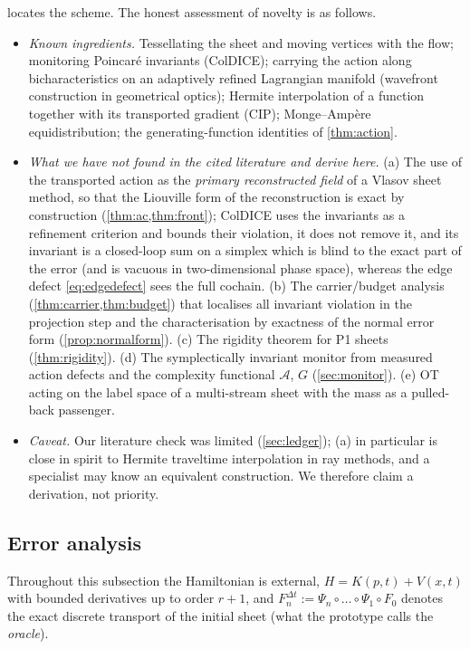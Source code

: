  locates the scheme. The honest assessment of novelty is as follows.
\begin{itemize}[leftmargin=1.6em,itemsep=2pt]
\item \emph{Known ingredients.} Tessellating the sheet and moving vertices with the flow; monitoring Poincar\'e
invariants (ColDICE); carrying the action along bicharacteristics on an adaptively refined Lagrangian manifold
(wavefront construction in geometrical optics); Hermite interpolation of a function together with its transported
gradient (CIP); Monge--Amp\`ere equidistribution; the generating-function identities of \cref{thm:action}.
\item \emph{What we have not found in the cited literature and derive here.} (a) The use of the transported action
as the \emph{primary reconstructed field} of a Vlasov sheet method, so that the Liouville form of the
reconstruction is exact by construction (\cref{thm:ac,thm:front}); ColDICE uses the invariants as a refinement
criterion and bounds their violation, it does not remove it, and its invariant is a closed-loop sum on a simplex
which is blind to the exact part of the error (and is vacuous in two-dimensional phase space), whereas the edge
defect \eqref{eq:edgedefect} sees the full cochain. (b) The carrier/budget analysis (\cref{thm:carrier,thm:budget})
that localises all invariant violation in the projection step and the characterisation by exactness of the normal
error form (\cref{prop:normalform}). (c) The rigidity theorem for P1 sheets (\cref{thm:rigidity}). (d) The
symplectically invariant monitor from measured action defects and the complexity functional $\mathcal A$, $G$
(\cref{sec:monitor}). (e) OT acting on the label space of a multi-stream sheet with the mass as a pulled-back passenger.
\item \emph{Caveat.} Our literature check was limited (\cref{sec:ledger}); (a) in particular is close in spirit to
Hermite traveltime interpolation in ray methods, and a specialist may know an equivalent construction. We
therefore claim a derivation, not priority.
\end{itemize}

\subsection{Error analysis}\label{sec:error}

Throughout this subsection the Hamiltonian is external, $H=K(p,t)+V(x,t)$ with bounded derivatives up to order
$r+1$, and $F^{\Delta t}_n:=\Psi_n\circ\dots\circ\Psi_1\circ F_0$ denotes the exact discrete transport of the
initial sheet (what the prototype calls the \emph{oracle}).

